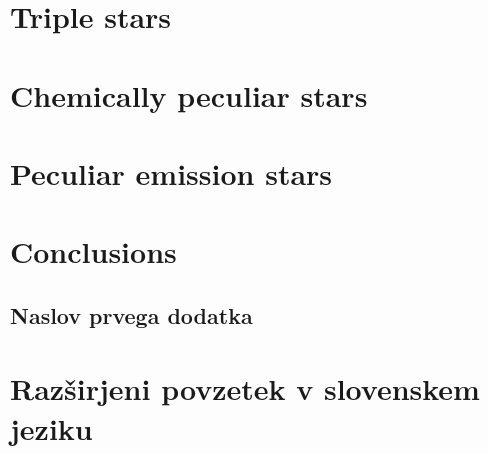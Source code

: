 \chapter{Triple stars}


\chapter{Chemically peculiar stars}


\chapter{Peculiar emission stars}


\chapter{Conclusions}




\cleardoublepage{}
\renewcommand\bibname{Bibliography}





\cleardoublepage{}
\renewcommand\appendixname{Appendix}
\begin{appendices}

\chapter{Naslov prvega dodatka}
    

\end{appendices}


\cleardoublepage{}
{}
\chapter*{Razširjeni povzetek v slovenskem jeziku}


